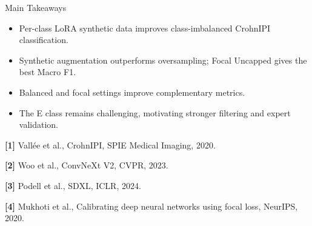 \begin{frame}[t]
\begin{columns}[t]
\begin{column}{\colwidth}
\begin{block}{Main Takeaways}
\begin{itemize}
  \item Per-class LoRA synthetic data improves class-imbalanced CrohnIPI classification.
  \item Synthetic augmentation outperforms oversampling; Focal Uncapped gives the best Macro F1.
  \item Balanced and focal settings improve complementary metrics.
  \item The E class remains challenging, motivating stronger filtering and expert validation.
\end{itemize}

{\tiny
\textbf{[1]} Vallée et al., CrohnIPI, SPIE Medical Imaging, 2020.\par
\textbf{[2]} Woo et al., ConvNeXt V2, CVPR, 2023.\par
\textbf{[3]} Podell et al., SDXL, ICLR, 2024.\par
\textbf{[4]} Mukhoti et al., Calibrating deep neural networks using focal loss, NeurIPS, 2020.\par
}

\end{block}

\end{column}

\separatorcolumn

\end{columns}

\end{frame}

